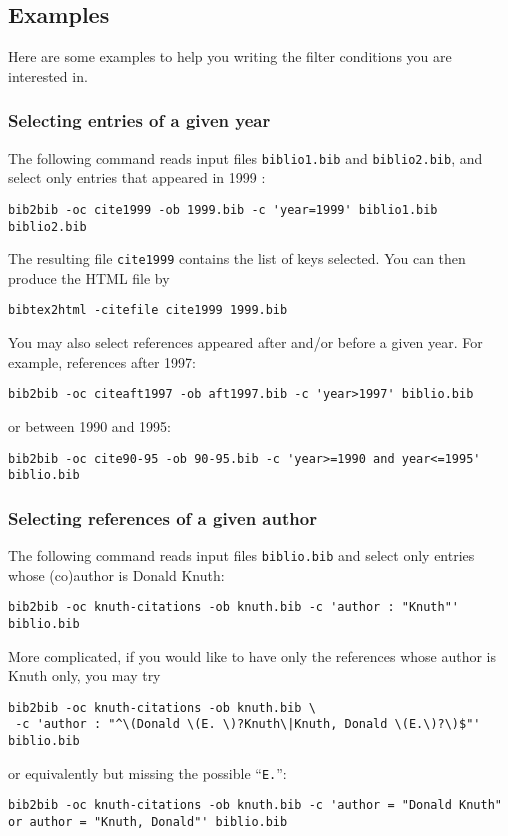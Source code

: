 \documentclass[11pt,a4paper]{article}
\begin{document}
\subsection{Examples}

Here are some examples to help you writing the filter conditions you
are interested in.

\subsubsection{Selecting entries of a given year}

The following command reads input files \verb|biblio1.bib| and
\verb|biblio2.bib|, and select only entries that appeared in 1999 :
\begin{verbatim}
bib2bib -oc cite1999 -ob 1999.bib -c 'year=1999' biblio1.bib biblio2.bib 
\end{verbatim}
The resulting file \verb|cite1999| contains the list of keys
selected. You can then produce the HTML file by
\begin{verbatim}
bibtex2html -citefile cite1999 1999.bib
\end{verbatim}

You may also select references appeared after and/or before a given
year. For example, references after 1997:
\begin{verbatim}
bib2bib -oc citeaft1997 -ob aft1997.bib -c 'year>1997' biblio.bib 
\end{verbatim}
or between 1990 and 1995:
\begin{verbatim}
bib2bib -oc cite90-95 -ob 90-95.bib -c 'year>=1990 and year<=1995' biblio.bib 
\end{verbatim}

\subsubsection{Selecting references of a given author}

The following command reads input files \verb|biblio.bib| and select
only entries whose (co)author is Donald Knuth: 
\begin{verbatim}
bib2bib -oc knuth-citations -ob knuth.bib -c 'author : "Knuth"' biblio.bib
\end{verbatim}
More complicated, if you would like to have only the references whose
author is Knuth only, you may try
\begin{verbatim}
bib2bib -oc knuth-citations -ob knuth.bib \
 -c 'author : "^\(Donald \(E. \)?Knuth\|Knuth, Donald \(E.\)?\)$"' biblio.bib
\end{verbatim}
or equivalently but missing the possible ``\verb|E.|'':
\begin{verbatim}
bib2bib -oc knuth-citations -ob knuth.bib -c 'author = "Donald Knuth"
or author = "Knuth, Donald"' biblio.bib
\end{verbatim}
\end{document}
